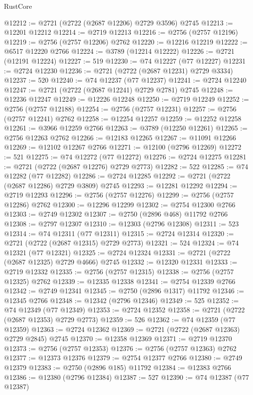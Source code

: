 \begin{lexlean}{RustCore}
\begin{coremodule}
@12212 := @2721 (@2722 (@2687 @12206) @2729 @3596) @2745
@12213 := @12201 @12212
@12214 := @2719 @12213
@12216 := @2756 (@2757 @12196)
@12219 := @2756 (@2757 @12206) @2762
@12220 := @12216 @12219
@12222 := @6517 @12220 @2766
@12224 := @3789 (@12214 @12222)
@12226 := @2721 (@12191 @12224)
@12227 := 519
@12230 := @74 @12227 (@77 @12227)
@12231 := @2724 @12230
@12236 := @2721 (@2722 (@2687 @12231) @2729 @3334)
@12237 := 520
@12240 := @74 @12237 (@77 @12237)
@12241 := @2724 @12240
@12247 := @2721 (@2722 (@2687 @12241) @2729 @2781) @2745
@12248 := @12236 @12247
@12249 := @12226 @12248
@12250 := @2719 @12249
@12252 := @2756 (@2757 @12188)
@12254 := @2756 (@2757 @12231)
@12257 := @2756 (@2757 @12241) @2762
@12258 := @12254 @12257
@12259 := @12252 @12258
@12261 := @3966 @12259 @2766
@12263 := @3789 (@12250 @12261)
@12265 := @2756 @12263 @2762
@12266 := @12183 @12265
@12267 := @11091 @12266
@12269 := @12102 @12267 @2766
@12271 := @12100 (@2796 @12269)
@12272 := 521
@12275 := @74 @12272 (@77 @12272)
@12276 := @2724 @12275
@12281 := @2721 (@2722 (@2687 @12276) @2729 @2773)
@12282 := 522
@12285 := @74 @12282 (@77 @12282)
@12286 := @2724 @12285
@12292 := @2721 (@2722 (@2687 @12286) @2729 @3809) @2745
@12293 := @12281 @12292
@12294 := @2719 @12293
@12296 := @2756 (@2757 @12276)
@12299 := @2756 (@2757 @12286) @2762
@12300 := @12296 @12299
@12302 := @2754 @12300 @2766
@12303 := @2749 @12302
@12307 := @2750 (@2896 @468) @11792 @2766
@12308 := @2797 @12307
@12310 := @12303 (@2796 @12308)
@12311 := 523
@12314 := @74 @12311 (@77 @12311)
@12315 := @2724 @12314
@12320 := @2721 (@2722 (@2687 @12315) @2729 @2773)
@12321 := 524
@12324 := @74 @12321 (@77 @12321)
@12325 := @2724 @12324
@12331 := @2721 (@2722 (@2687 @12325) @2729 @4666) @2745
@12332 := @12320 @12331
@12333 := @2719 @12332
@12335 := @2756 (@2757 @12315)
@12338 := @2756 (@2757 @12325) @2762
@12339 := @12335 @12338
@12341 := @2754 @12339 @2766
@12342 := @2749 @12341
@12345 := @2750 (@2896 @1317) @11792
@12346 := @12345 @2766
@12348 := @12342 (@2796 @12346)
@12349 := 525
@12352 := @74 @12349 (@77 @12349)
@12353 := @2724 @12352
@12358 := @2721 (@2722 (@2687 @12353) @2729 @2773)
@12359 := 526
@12362 := @74 @12359 (@77 @12359)
@12363 := @2724 @12362
@12369 := @2721 (@2722 (@2687 @12363) @2729 @2845) @2745
@12370 := @12358 @12369
@12371 := @2719 @12370
@12373 := @2756 (@2757 @12353)
@12376 := @2756 (@2757 @12363) @2762
@12377 := @12373 @12376
@12379 := @2754 @12377 @2766
@12380 := @2749 @12379
@12383 := @2750 (@2896 @185) @11792
@12384 := @12383 @2766
@12386 := @12380 (@2796 @12384)
@12387 := 527
@12390 := @74 @12387 (@77 @12387)

\end{coremodule}
\end{lexlean}
